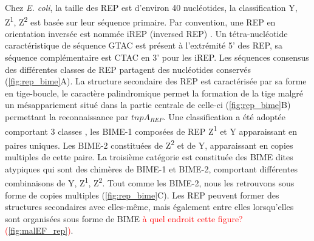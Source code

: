 \documentclass[12pt,a4paper]{report}
\begin{document}
\begin{onehalfspace}
Chez \textit{E. coli}, la taille des REP est d'environ 40 nucléotides, la classification Y, Z\textsuperscript{1}, Z\textsuperscript{2} est basée sur leur séquence primaire. Par convention, une REP en orientation inversée est nommée iREP (inversed REP) \citep{Ton-Hoang2012}. Un tétra-nucléotide caractéristique de séquence GTAC est présent à l'extrémité 5' des REP, sa séquence complémentaire est CTAC en 3' pour les iREP. Les séquences consensus des différentes classes de REP partagent des nucléotides conservés (\autoref{fig:rep_bime}A). La structure secondaire des REP est caractérisée par sa forme en tige-boucle, le caractère palindromique permet la formation de la tige malgré un mésappariement situé dans la partie centrale de celle-ci (\autoref{fig:rep_bime}B) permettant la reconnaissance par $tnpA_{REP}$. Une classification a été adoptée comportant 3 classes \citep{Bachellier1997}, les BIME-1 composées de REP Z\textsuperscript{1} et Y apparaissant en paires uniques. Les BIME-2 constituées de Z\textsuperscript{2} et de Y, apparaissant en copies multiples de cette paire. La troisième catégorie est constituée des BIME dites atypiques qui sont des chimères de BIME-1 et BIME-2, comportant différentes combinaisons de Y, Z\textsuperscript{1}, Z\textsuperscript{2}. Tout comme les BIME-2, nous les retrouvons sous forme de copies multiples (\autoref{fig:rep_bime}C). Les REP peuvent former des structures secondaires avec elles-même, mais également entre elles lorsqu'elles sont organisées sous forme de BIME \textcolor{red}{à quel endroit cette figure? (\autoref{fig:malEF_rep})}.


\end{onehalfspace}
\end{document}
